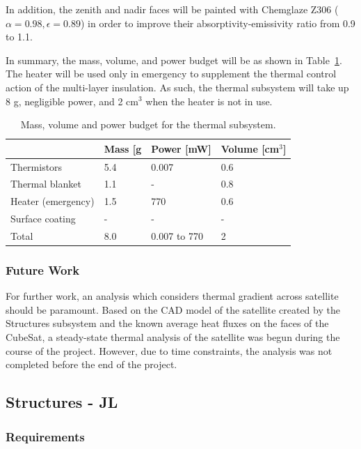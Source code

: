 \documentclass[12pt]{article}
\begin{document}
In addition, the zenith and nadir faces will be painted with Chemglaze Z306 ($\alpha= 0.98, \epsilon = 0.89$) in order to improve their absorptivity-emissivity ratio from 0.9 to 1.1.

In summary, the mass, volume, and power budget will be as shown in Table~\ref{table:thermal-outputs}.  The heater will be used only in emergency to supplement the thermal control action of the multi-layer insulation. As such, the thermal subsystem will take up 8 g, negligible power, and 2 cm$^3$ when the heater is not in use.

\begin{table}[ht]%
\centering
\caption{Mass, volume and power budget for the thermal subsystem.}
\label{table:thermal-outputs}
\begin{tabular}{|l|l|l|l|}\hline
& Mass [g & Power [mW] & Volume [cm$^3$] \\\hline
Thermistors & 5.4 & 0.007 & 0.6 \\\hline
Thermal blanket & 1.1 & -  & 0.8 \\\hline
Heater (emergency) & 1.5 & 770 & 0.6 \\\hline
Surface coating & - & - & - \\\hline
Total & 8.0 & 0.007 to 770 &  2\\\hline
\end{tabular}
\end{table}

\subsubsection{Future Work}

For further work, an analysis which considers thermal gradient across satellite should be paramount. Based on the CAD model of the satellite created by the Structures subsystem and the known average heat fluxes on the faces of the CubeSat, a steady-state thermal analysis of the satellite was begun during the course of the project. However, due to time constraints, the analysis was not completed before the end of the project.

\newpage
\FloatBarrier

\subsection{Structures - JL}

\subsubsection{Requirements}
\end{document}
